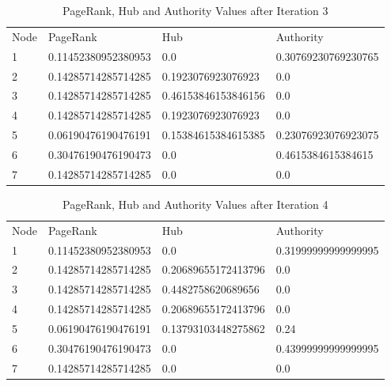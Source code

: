 \documentclass[12pt]{report}
\begin{document}
\begin{table}[]
\centering
\caption{PageRank, Hub and Authority Values after Iteration 3}
\label{my-label}
\begin{tabular}{llll}
Node & PageRank            & Hub                 & Authority           \\
1    & 0.11452380952380953 & 0.0                 & 0.30769230769230765 \\
2    & 0.14285714285714285 & 0.1923076923076923  & 0.0                 \\
3    & 0.14285714285714285 & 0.46153846153846156 & 0.0                 \\
4    & 0.14285714285714285 & 0.1923076923076923  & 0.0                 \\
5    & 0.06190476190476191 & 0.15384615384615385 & 0.23076923076923075 \\
6    & 0.30476190476190473 & 0.0                 & 0.4615384615384615  \\
7    & 0.14285714285714285 & 0.0                 & 0.0                
\end{tabular}
\end{table}

\begin{table}[]
\centering
\caption{PageRank, Hub and Authority Values after Iteration 4}
\label{my-label}
\begin{tabular}{llll}
Node & PageRank            & Hub                 & Authority           \\
1    & 0.11452380952380953 & 0.0                 & 0.31999999999999995 \\
2    & 0.14285714285714285 & 0.20689655172413796 & 0.0                 \\
3    & 0.14285714285714285 & 0.4482758620689656  & 0.0                 \\
4    & 0.14285714285714285 & 0.20689655172413796 & 0.0                 \\
5    & 0.06190476190476191 & 0.13793103448275862 & 0.24                \\
6    & 0.30476190476190473 & 0.0                 & 0.43999999999999995 \\
7    & 0.14285714285714285 & 0.0                 & 0.0                
\end{tabular}
\end{table}
\end{document}
